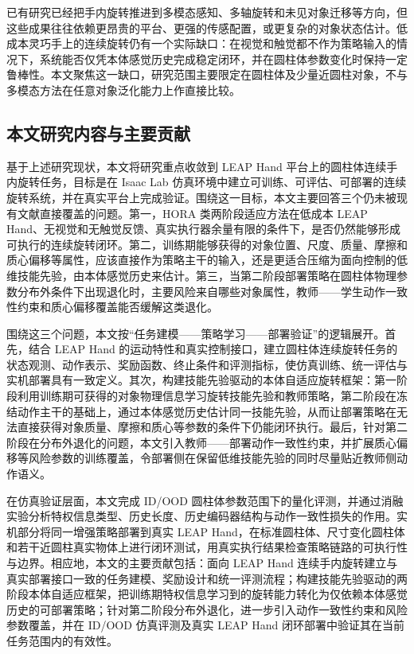 已有研究已经把手内旋转推进到多模态感知、多轴旋转和未见对象迁移等方向，但这些成果往往依赖更昂贵的平台、更强的传感配置，或更复杂的对象状态估计。低成本灵巧手上的连续旋转仍有一个实际缺口：在视觉和触觉都不作为策略输入的情况下，系统能否仅凭本体感觉历史完成稳定闭环，并在圆柱体参数变化时保持一定鲁棒性。本文聚焦这一缺口，研究范围主要限定在圆柱体及少量近圆柱对象，不与多模态方法在任意对象泛化能力上作直接比较。

\subsection{本文研究内容与主要贡献}
\thesisbodyfont
基于上述研究现状，本文将研究重点收敛到 LEAP Hand 平台上的圆柱体连续手内旋转任务，目标是在 Isaac Lab 仿真环境中建立可训练、可评估、可部署的连续旋转系统，并在真实平台上完成验证。围绕这一目标，本文主要回答三个仍未被现有文献直接覆盖的问题。第一，HORA 类两阶段适应方法在低成本 LEAP Hand、无视觉和无触觉反馈、真实执行器余量有限的条件下，是否仍然能够形成可执行的连续旋转闭环。第二，训练期能够获得的对象位置、尺度、质量、摩擦和质心偏移等属性，应该直接作为策略主干的输入，还是更适合压缩为面向控制的低维技能先验，由本体感觉历史来估计。第三，当第二阶段部署策略在圆柱体物理参数分布外条件下出现退化时，主要风险来自哪些对象属性，教师——学生动作一致性约束和质心偏移覆盖能否缓解这类退化。

围绕这三个问题，本文按“任务建模——策略学习——部署验证”的逻辑展开。首先，结合 LEAP Hand 的运动特性和真实控制接口，建立圆柱体连续旋转任务的状态观测、动作表示、奖励函数、终止条件和评测指标，使仿真训练、统一评估与实机部署具有一致定义。其次，构建技能先验驱动的本体自适应旋转框架：第一阶段利用训练期可获得的对象物理信息学习旋转技能先验和教师策略，第二阶段在冻结动作主干的基础上，通过本体感觉历史估计同一技能先验，从而让部署策略在无法直接获得对象质量、摩擦和质心等参数的条件下仍能闭环执行。最后，针对第二阶段在分布外退化的问题，本文引入教师——部署动作一致性约束，并扩展质心偏移等风险参数的训练覆盖，令部署侧在保留低维技能先验的同时尽量贴近教师侧动作语义。

在仿真验证层面，本文完成 ID/OOD 圆柱体参数范围下的量化评测，并通过消融实验分析特权信息类型、历史长度、历史编码器结构与动作一致性损失的作用。实机部分将同一增强策略部署到真实 LEAP Hand，在标准圆柱体、尺寸变化圆柱体和若干近圆柱真实物体上进行闭环测试，用真实执行结果检查策略链路的可执行性与边界。相应地，本文的主要贡献包括：面向 LEAP Hand 连续手内旋转建立与真实部署接口一致的任务建模、奖励设计和统一评测流程；构建技能先验驱动的两阶段本体自适应框架，把训练期特权信息学习到的旋转能力转化为仅依赖本体感觉历史的可部署策略；针对第二阶段分布外退化，进一步引入动作一致性约束和风险参数覆盖，并在 ID/OOD 仿真评测及真实 LEAP Hand 闭环部署中验证其在当前任务范围内的有效性。


